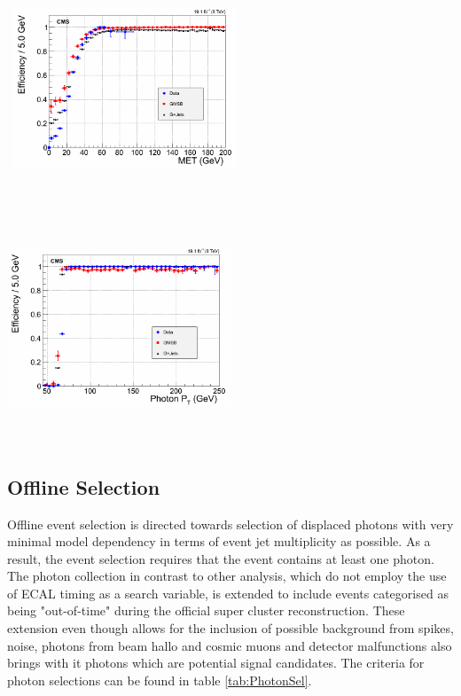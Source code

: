 \begin{center}
\centering
\mbox{
\includegraphics[height=7cm, width=0.5\textwidth]{THESISPLOTS/PFMET_EffAsym.png}
\includegraphics[height=7cm, width=0.5\textwidth]{THESISPLOTS/Photon_EffAsym.png}}
\label{fig:HLTEff}
\end{center}

\subsection{Offline Selection}
Offline event selection is directed towards selection of displaced photons with very minimal model dependency in terms of event jet multiplicity as possible. As a result, the event selection requires that the event contains at least one photon. The photon collection in contrast to other analysis, which do not employ the use of ECAL timing as a search variable, is extended to include events categorised as being "out-of-time" during the official super cluster reconstruction. These extension even though allows for the inclusion of possible background from spikes, noise, photons from beam hallo and cosmic muons and detector malfunctions also brings with it photons which are potential signal candidates.
The criteria for photon selections can be found in table \ref{tab:PhotonSel}. 

